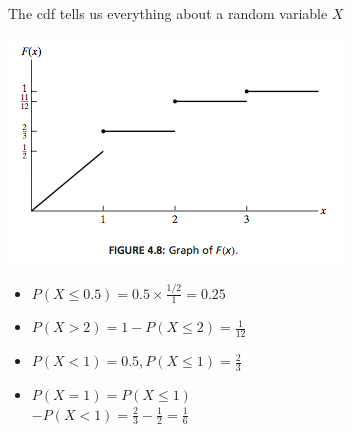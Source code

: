 \documentclass[slidestop,compress,mathserif]{beamer}
\begin{document}
\begin{frame}{The cdf tells us everything about a random variable $X$}

\vspace{-0.5cm}
\begin{center}
\includegraphics[scale=0.7]{figures/cdf}
\end{center}

\pause \vspace{-0.5cm}
{
\begin{itemize}
\item $P(X \leq 0.5) = 0.5 \times \frac{1/2}{1} = 0.25$
\pause
\item $P(X > 2) = 1 - P(X \leq 2) = \frac{1}{12}$
\end{itemize}
}
{
\pause
\begin{itemize}
\item $P(X < 1) = 0.5, P(X \leq 1) = \frac{2}{3}$
\pause
\item $P(X = 1) = P(X \leq 1)$\\ $- P(X < 1) = \frac{2}{3} - \frac{1}{2} = \frac{1}{6}$
\end{itemize}
}

\end{frame}
\end{document}
